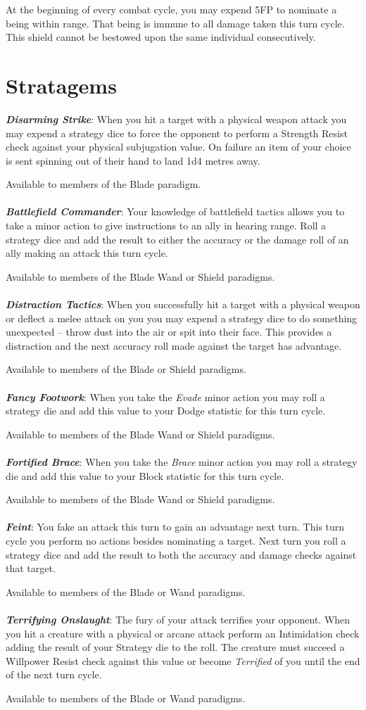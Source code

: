 {{	At the beginning of every combat cycle, you may expend 5FP to nominate a being within range. That being is immune to all damage taken this turn cycle. This shield cannot be bestowed upon the same individual consecutively. 
}

\section*{Stratagems}

\newcommand\stratagem[3]
{
{\large \textbf{\textit{#1}}}: #2

Available to members of the {#3}. \\~\\ 
}

\stratagem{Disarming Strike}{When you hit a target with a physical weapon attack\comma{} you may expend a strategy dice to force the opponent to perform a Strength Resist check against your physical subjugation value. On failure\comma{} an item of your choice is sent spinning out of their hand to land 1d4 metres away.}{Blade paradigm}
\stratagem{Battlefield Commander}{Your knowledge of battlefield tactics allows you to take a minor action to give instructions to an ally in hearing range. Roll a strategy dice\comma{} and add the result to either the accuracy or the damage roll of an ally making an attack this turn cycle.}{Blade\comma{} Wand or Shield paradigms}
\stratagem{Distraction Tactics}{When you successfully hit a target with a physical weapon\comma{} or deflect a melee attack on you\comma{} you may expend a strategy dice to do something unexpected – throw dust into the air\comma{} or spit into their face. This provides a distraction\comma{} and the next accuracy roll made against the target has advantage.}{Blade or Shield paradigms}
\stratagem{Fancy Footwork}{When you take the {\it Evade} minor action\comma{} you may roll a strategy die and add this value to your Dodge statistic for this turn cycle.}{Blade\comma{} Wand or Shield paradigms}
\stratagem{Fortified Brace}{When you take the {\it Brace} minor action\comma{} you may roll a strategy die and add this value to your Block statistic for this turn cycle.}{Blade\comma{} Wand or Shield paradigms}
\stratagem{Feint}{You fake an attack this turn\comma{} to gain an advantage next turn. This turn cycle\comma{} you perform no actions besides nominating a target. Next turn\comma{} you roll a strategy dice and add the result to both the accuracy and damage checks against that target.}{Blade or Wand paradigms}
\stratagem{Terrifying Onslaught}{The fury of your attack terrifies your opponent. When you hit a creature with a physical or arcane attack\comma{} perform an Intimidation check\comma{} adding the result of your Strategy die to the roll. The creature must succeed a Willpower Resist check against this value\comma{} or become {\it Terrified} of you until the end of the next turn cycle.}{Blade or Wand paradigms}
}
